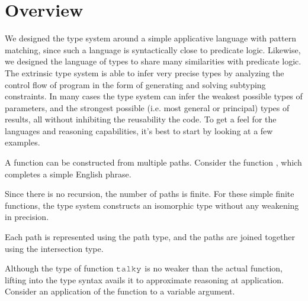 \documentclass[acmsmall]{acmart}
\theoremstyle{definition}
\begin{document}
\section{Overview}
\label{sec:overview}
We designed the type system around a simple applicative language with pattern matching,
since such a language is syntactically close to predicate logic. Likewise,
we designed the language of types to share many similarities with predicate logic. 
The extrinsic type system is able to infer very precise types by analyzing the control
flow of program in the form of generating and solving subtyping constraints. 
In many cases the type system can infer the weakest possible types of parameters,
and the strongest possible (i.e. most general or principal) types of results,
all without inhibiting the reusability the code.
To get a feel for the languages and reasoning capabilities, it's best to start by
looking at a few examples.

A function can be constructed from multiple paths. 
Consider the function , which completes a simple English phrase.


\noindent
Since there is no recursion, the number of paths is finite.
For these simple finite functions, the type system constructs
an isomorphic type without any weakening in precision. 


\noindent
Each path is represented using the path type,
and the paths are joined together using the intersection type.

Although the type of function $\J{talky}$ is no weaker than the actual function,
lifting into the type syntax avails it to approximate reasoning at application.
Consider an application of the function to a variable argument. 

\end{document}
